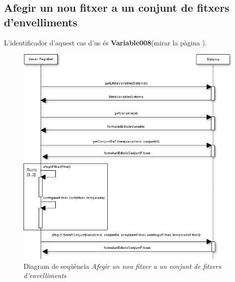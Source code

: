 \subsection*{Afegir un nou fitxer a un conjunt de fitxers d'envelliments}
L'identificador d'aquest cas d'us \'{e}s \textbf{Variable008}(mirar la p\`{a}gina \pageref{variable008}).
\begin{figure}[H]
  \centering
  \includegraphics[scale=0.6]{img/specification/SequenceAddNewFilesToSeasonSet.png}
  \caption{Diagram de seqüència \textit{Afegir un nou fitxer a un conjunt de fitxers d'envelliments}}
  \label{fig:sequenceaddnewseason}
\end{figure}

